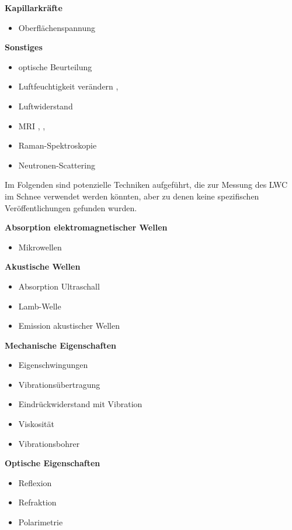 \textbf{Kapillarkräfte}
\begin{itemize}

\item Oberflächenspannung \cite{AlamShibly.2017}
\end{itemize}

\textbf{Sonstiges}
\begin{itemize}
\item optische Beurteilung \cite{miro}
\item Luftfeuchtigkeit verändern \cite{joule-thomson-wiki}, \cite{sensirion-sht4xa-sensors}
\item Luftwiderstand
\item MRI \cite{Adachi.2020}, \cite{Nowogrodzki.2018}, \cite{Yamaguchi.2023}
\item Raman-Spektroskopie \cite{Reichardt.2022}
\item Neutronen-Scattering \cite{Lombardo.2023}
\end{itemize}


Im Folgenden sind potenzielle Techniken aufgeführt, die zur Messung des LWC im Schnee verwendet werden könnten, aber zu denen keine spezifischen Veröffentlichungen gefunden wurden.

\textbf{Absorption elektromagnetischer Wellen}
\begin{itemize}
\item Mikrowellen
\end{itemize}



\textbf{Akustische Wellen}
\begin{itemize}
\item Absorption Ultraschall
\item Lamb-Welle \cite{lamb}
\item Emission akustischer Wellen
\end{itemize}


\textbf{Mechanische Eigenschaften}
\begin{itemize}
\item Eigenschwingungen
\item Vibrationsübertragung
\item Eindrückwiderstand mit Vibration
\item Viskosität
\item Vibrationsbohrer
\end{itemize}


\textbf{Optische Eigenschaften}
\begin{itemize}
\item Reflexion
\item Refraktion
\item Polarimetrie
\end{itemize}

